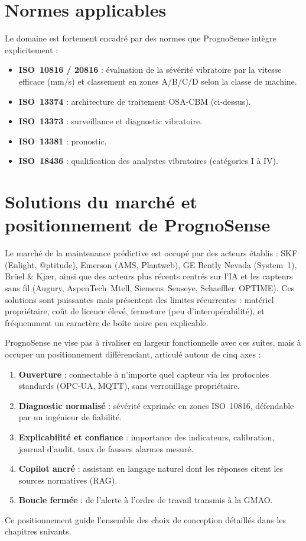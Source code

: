 \section{Normes applicables}
Le domaine est fortement encadré par des normes que PrognoSense intègre explicitement :
\begin{itemize}[leftmargin=1.5em]
  \item \textbf{ISO~10816 / 20816} : évaluation de la sévérité vibratoire par la vitesse
        efficace (mm/s) et classement en zones A/B/C/D selon la classe de machine.
  \item \textbf{ISO~13374} : architecture de traitement OSA-CBM (ci-dessus).
  \item \textbf{ISO~13373} : surveillance et diagnostic vibratoire.
  \item \textbf{ISO~13381} : pronostic.
  \item \textbf{ISO~18436} : qualification des analystes vibratoires (catégories I à IV).
\end{itemize}

\section{Solutions du marché et positionnement de PrognoSense}
Le marché de la maintenance prédictive est occupé par des acteurs établis : SKF
(Enlight, @ptitude), Emerson (AMS, Plantweb), GE Bently Nevada (System~1), Brüel \& Kjær,
ainsi que des acteurs plus récents centrés sur l'IA et les capteurs sans fil (Augury,
AspenTech~Mtell, Siemens~Senseye, Schaeffler~OPTIME). Ces solutions sont puissantes mais
présentent des limites récurrentes : matériel propriétaire, coût de licence élevé,
fermeture (peu d'interopérabilité), et fréquemment un caractère de \og boîte noire \fg{}
peu explicable.

PrognoSense ne vise pas à rivaliser en largeur fonctionnelle avec ces suites, mais à
occuper un positionnement différenciant, articulé autour de cinq axes :
\begin{enumerate}[leftmargin=1.6em]
  \item \textbf{Ouverture} : connectable à n'importe quel capteur via les protocoles
        standards (OPC-UA, MQTT), sans verrouillage propriétaire.
  \item \textbf{Diagnostic normalisé} : sévérité exprimée en zones ISO~10816, défendable
        par un ingénieur de fiabilité.
  \item \textbf{Explicabilité et confiance} : importance des indicateurs, calibration,
        journal d'audit, taux de fausses alarmes mesuré.
  \item \textbf{Copilot ancré} : assistant en langage naturel dont les réponses citent
        les sources normatives (RAG).
  \item \textbf{Boucle fermée} : de l'alerte à l'ordre de travail transmis à la GMAO.
\end{enumerate}
Ce positionnement guide l'ensemble des choix de conception détaillés dans les chapitres
suivants.
